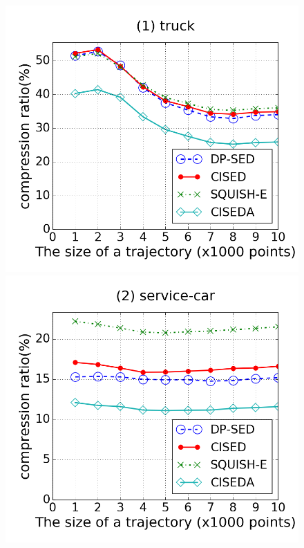 \begin{figure}[tb!]
\centering
\includegraphics[scale = 0.250]{figures/Exp-CR-size-truck.png}
\includegraphics[scale = 0.250]{figures/Exp-CR-size-service.png}

\end{figure}

